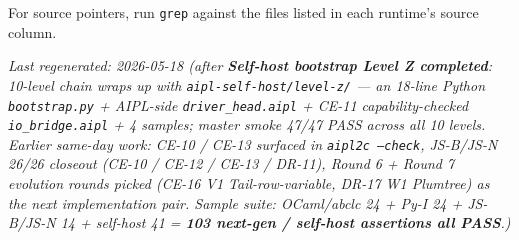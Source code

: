 \documentclass[10pt,a4paper,landscape]{article}
\begin{document}
For source pointers, run \texttt{grep} against the files listed in
each runtime's source column.

\bigskip
\noindent\textit{Last regenerated: 2026-05-18 (after \textbf{Self-host bootstrap Level Z completed}: 10-level chain wraps up with \texttt{aipl-self-host/level-z/} --- an 18-line Python \texttt{bootstrap.py} + AIPL-side \texttt{driver\_head.aipl} + CE-11 capability-checked \texttt{io\_bridge.aipl} + 4 samples; master smoke 47/47 PASS across all 10 levels.  Earlier same-day work: CE-10 / CE-13 surfaced in \texttt{aipl2c --check}, JS-B/JS-N 26/26 closeout (CE-10 / CE-12 / CE-13 / DR-11), Round 6 + Round 7 evolution rounds picked (CE-16 V1 Tail-row-variable, DR-17 W1 Plumtree) as the next implementation pair.  Sample suite: OCaml/abclc 24 + Py-I 24 + JS-B/JS-N 14 + self-host 41 = \textbf{103 next-gen / self-host assertions all PASS}.)}
\end{document}
